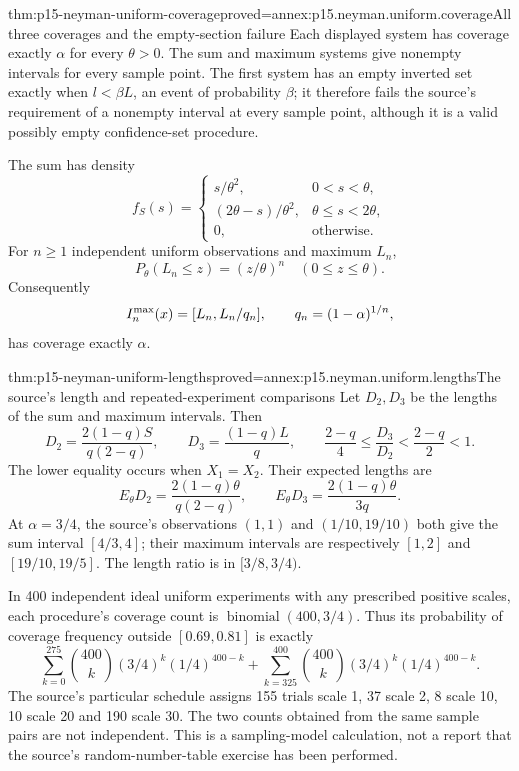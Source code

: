 \begin{hbtheorem}{thm:p15-neyman-uniform-coverage}{proved=annex:p15.neyman.uniform.coverage}{All three coverages and the empty-section failure}
Each displayed system has coverage exactly \(\alpha\) for every
\(\theta>0\). The sum and maximum systems give nonempty intervals
for every sample point. The first system has an empty inverted
set exactly when \(l<\beta L\), an event of probability \(\beta\);
it therefore fails the source's requirement of a nonempty interval
at every sample point, although it is a valid possibly empty
confidence-set procedure.

The sum has density
\[
 f_S(s)=
 \begin{cases}s/\theta^2,&0<s<\theta,\\
 (2\theta-s)/\theta^2,&\theta\leq s<2\theta,\\
 0,&\text{otherwise}.
 \end{cases}
\]
For \(n\geq1\) independent uniform observations and maximum \(L_n\),
\[
 P_\theta(L_n\leq z)=(z/\theta)^n\quad(0\leq z\leq\theta).
\]
Consequently
\[
 I_n^{\rm max}(x)=[L_n,L_n/q_n],\qquad q_n=(1-\alpha)^{1/n},
\]
has coverage exactly \(\alpha\).
\end{hbtheorem}

\begin{hbtheorem}{thm:p15-neyman-uniform-lengths}{proved=annex:p15.neyman.uniform.lengths}{The source's length and repeated-experiment comparisons}
Let \(D_2,D_3\) be the lengths of the sum and maximum intervals.
Then
\[
 D_2=\frac{2(1-q)S}{q(2-q)},\qquad
 D_3=\frac{(1-q)L}{q},\qquad
 \frac{2-q}{4}\leq\frac{D_3}{D_2}<\frac{2-q}{2}<1.
\]
The lower equality occurs when \(X_1=X_2\).
Their expected lengths are
\[
 E_\theta D_2=\frac{2(1-q)\theta}{q(2-q)},\qquad
 E_\theta D_3=\frac{2(1-q)\theta}{3q}.
\]
At \(\alpha=3/4\), the source's observations \((1,1)\)
and \((1/10,19/10)\) both give the sum interval
\([4/3,4]\); their maximum intervals are respectively
\([1,2]\) and \([19/10,19/5]\).
The length ratio is in \([3/8,3/4)\).

In 400 independent ideal uniform experiments with any prescribed
positive scales, each procedure's coverage count is
\(\operatorname{binomial}(400,3/4)\). Thus its probability
of coverage frequency outside \([0.69,0.81]\) is exactly
\[
 \sum_{k=0}^{275}\binom{400}k(3/4)^k(1/4)^{400-k}
 +\sum_{k=325}^{400}\binom{400}k(3/4)^k(1/4)^{400-k}.
\]
The source's particular schedule assigns 155 trials scale 1,
37 scale 2, 8 scale 10, 10 scale 20 and 190 scale 30.
The two counts obtained from the same sample pairs are not independent.
This is a sampling-model calculation, not a report that the source's
random-number-table exercise has been performed.
\end{hbtheorem}

